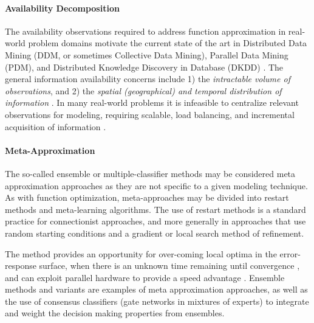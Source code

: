 \paragraph{Availability Decomposition}
The availability observations required to address function approximation in real-world problem domains motivate the current state of the art in Distributed Data Mining (DDM, or sometimes Collective Data Mining), Parallel Data Mining (PDM), and Distributed Knowledge Discovery in Database (DKDD) \cite{Kargupta2000}. The general information availability concerns include 1) the \emph{intractable volume of observations}, and 2) the \emph{spatial (geographical) and temporal distribution of information} \cite{Zaki1999}. In many real-world problems it is infeasible to centralize relevant observations for modeling, requiring scalable, load balancing, and incremental acquisition of information \cite{Skillicorn1999}. 
	
\paragraph{Meta-Approximation}
The so-called ensemble or multiple-classifier methods may be considered meta approximation approaches as they are not specific to a given modeling technique. As with function optimization, meta-approaches may be divided into restart methods and meta-learning algorithms. The use of restart methods is a standard practice for connectionist approaches, and more generally in approaches that use random starting conditions and a gradient or local search method of refinement. 

The method provides an opportunity for over-coming local optima in the error-response surface, when there is an unknown time remaining until convergence \cite{Magdon-ismail2000}, and can exploit parallel hardware to provide a speed advantage \cite{Blas2005}. Ensemble methods and variants are examples of meta approximation approaches, as well as the use of consensus classifiers (gate networks in mixtures of experts) to integrate and weight the decision making properties from ensembles. 

